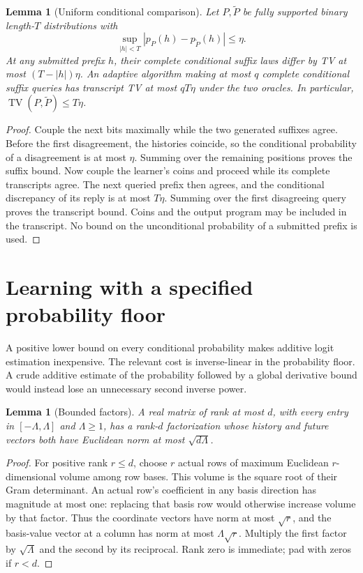\documentclass[11pt]{article}
\newcommand{\TV}{\operatorname{TV}}
\newtheorem{lemma}[theorem]{Lemma}
\theoremstyle{definition}
\theoremstyle{remark}
\begin{document}
\begin{lemma}[Uniform conditional comparison]\label{lem:coupling}
Let $P,\widetilde P$ be fully supported binary length-$T$ distributions with
\[
\sup_{|h|<T}|p_P(h)-p_{\widetilde P}(h)|\le\eta.
\]
At any submitted prefix $h$, their complete conditional suffix laws differ by TV at most $(T-|h|)\eta$. An adaptive algorithm making at most $q$ complete conditional suffix queries has transcript TV at most $qT\eta$ under the two oracles. In particular, $\TV(P,\widetilde P)\le T\eta$.
\end{lemma}
\begin{proof}
Couple the next bits maximally while the two generated suffixes agree. Before the first disagreement, the histories coincide, so the conditional probability of a disagreement is at most $\eta$. Summing over the remaining positions proves the suffix bound. Now couple the learner's coins and proceed while its complete transcripts agree. The next queried prefix then agrees, and the conditional discrepancy of its reply is at most $T\eta$. Summing over the first disagreeing query proves the transcript bound. Coins and the output program may be included in the transcript. No bound on the unconditional probability of a submitted prefix is used.
\end{proof}



\section{Learning with a specified probability floor}\label{sec:floor}

A positive lower bound on every conditional probability makes additive logit estimation inexpensive. The relevant cost is inverse-linear in the probability floor. A crude additive estimate of the probability followed by a global derivative bound would instead lose an unnecessary second inverse power.

\begin{lemma}[Bounded factors]\label{lem:bounded-factors}
A real matrix of rank at most $d$, with every entry in $[-\Lambda,\Lambda]$ and $\Lambda\ge1$, has a rank-$d$ factorization whose history and future vectors both have Euclidean norm at most $\sqrt{d\Lambda}$.
\end{lemma}
\begin{proof}
For positive rank $r\le d$, choose $r$ actual rows of maximum Euclidean $r$-dimensional volume among row bases. This volume is the square root of their Gram determinant. An actual row's coefficient in any basis direction has magnitude at most one: replacing that basis row would otherwise increase volume by that factor. Thus the coordinate vectors have norm at most $\sqrt r$, and the basis-value vector at a column has norm at most $\Lambda\sqrt r$. Multiply the first factor by $\sqrt\Lambda$ and the second by its reciprocal. Rank zero is immediate; pad with zeros if $r<d$.
\end{proof}
\end{document}
